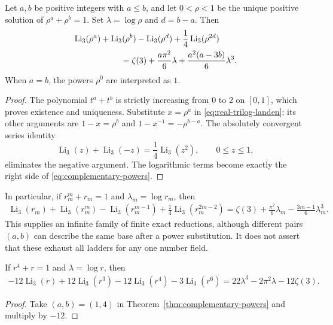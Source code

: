 \begin{theorem}
\label{thm:complementary-powers}
Let $a,b$ be positive integers with $a\le b$, and let $0<\rho<1$ be
the unique positive solution of $\rho^a+\rho^b=1$. Set
$\lambda=\log\rho$ and $d=b-a$. Then
\begin{align}
&\operatorname{Li}_3(\rho^a)+\operatorname{Li}_3(\rho^b)
 -\operatorname{Li}_3(\rho^d)
 +\frac14\operatorname{Li}_3(\rho^{2d})\notag\\
&\hspace{20mm}=\zeta(3)+\frac{a\pi^2}{6}\lambda
 +\frac{a^2(a-3b)}{6}\lambda^3.
\label{eq:complementary-powers}
\end{align}
When $a=b$, the powers $\rho^0$ are interpreted as $1$.
\end{theorem}

\begin{proof}
The polynomial $t^a+t^b$ is strictly increasing from $0$ to $2$ on
$[0,1]$, which proves existence and uniqueness. Substitute $x=\rho^a$
in \eqref{eq:real-trilog-landen}; its other arguments are
$1-x=\rho^b$ and $1-x^{-1}=-\rho^{b-a}$. The absolutely convergent
series identity
\[
\operatorname{Li}_3(z)+\operatorname{Li}_3(-z)
 =\frac14\operatorname{Li}_3(z^2),\qquad 0\le z\le1,
\]
eliminates the negative argument. The logarithmic terms become exactly
the right side of \eqref{eq:complementary-powers}.
\end{proof}

In particular, if $r_m^m+r_m=1$ and $\lambda_m=\log r_m$, then
\begin{align}
\operatorname{Li}_3(r_m)+\operatorname{Li}_3(r_m^m)
 -\operatorname{Li}_3(r_m^{m-1})
 +\frac14\operatorname{Li}_3(r_m^{2m-2})
 =\zeta(3)+\frac{\pi^2}{6}\lambda_m
 -\frac{3m-1}{6}\lambda_m^3.
\label{eq:all-m-trilog}
\end{align}
This supplies an infinite family of finite exact reductions, although
different pairs $(a,b)$ can describe the same base after a power
substitution. It does not assert that these exhaust all ladders for
any one number field.

\begin{corollary}
If $r^4+r=1$ and $\lambda=\log r$, then
\begin{align}
-12\operatorname{Li}_3(r)+12\operatorname{Li}_3(r^3)
 -12\operatorname{Li}_3(r^4)-3\operatorname{Li}_3(r^6)
 =22\lambda^3-2\pi^2\lambda-12\zeta(3).
\label{eq:quartic-proved}
\end{align}
\end{corollary}
\begin{proof}
Take $(a,b)=(1,4)$ in Theorem~\ref{thm:complementary-powers}
and multiply by $-12$.
\end{proof}

